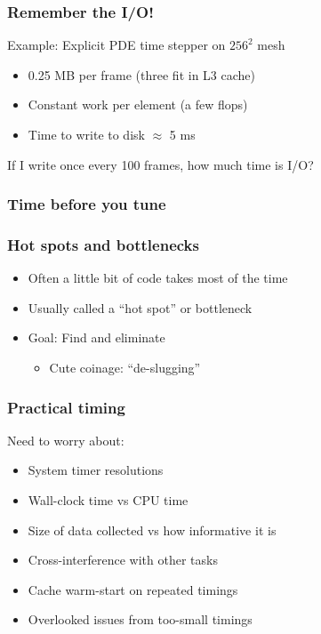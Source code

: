 \documentclass{beamer}
\begin{document}
\begin{frame}
  \frametitle{Remember the I/O!}

  Example: Explicit PDE time stepper on $256^2$ mesh
  \begin{itemize}
  \item 0.25 MB per frame (three fit in L3 cache)
  \item Constant work per element (a few flops)
  \item Time to write to disk $\approx$ 5 ms
  \end{itemize}
  If I write once every 100 frames, how much time is I/O?
\end{frame}




\begin{frame}
  \frametitle{Time before you tune}
\end{frame}


\begin{frame}
  \frametitle{Hot spots and bottlenecks}

  \begin{itemize}
  \item Often a little bit of code takes most of the time
  \item Usually called a ``hot spot'' or bottleneck
  \item Goal: Find and eliminate
    \begin{itemize}
    \item Cute coinage: ``de-slugging''
    \end{itemize}
  \end{itemize}
  
\end{frame}


\begin{frame}
  \frametitle{Practical timing}

  Need to worry about:
  \begin{itemize}
  \item System timer resolutions
  \item Wall-clock time vs CPU time
  \item Size of data collected vs how informative it is
  \item Cross-interference with other tasks
  \item Cache warm-start on repeated timings
  \item Overlooked issues from too-small timings
  \end{itemize}
\end{frame}
\end{document}
